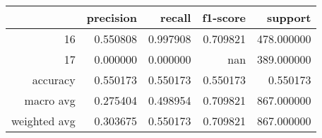 \begin{tabular}{rrrrr}
\toprule
 & precision & recall & f1-score & support \\
\midrule
16 & 0.550808 & 0.997908 & 0.709821 & 478.000000 \\
17 & 0.000000 & 0.000000 & nan & 389.000000 \\
accuracy & 0.550173 & 0.550173 & 0.550173 & 0.550173 \\
macro avg & 0.275404 & 0.498954 & 0.709821 & 867.000000 \\
weighted avg & 0.303675 & 0.550173 & 0.709821 & 867.000000 \\
\bottomrule
\end{tabular}
